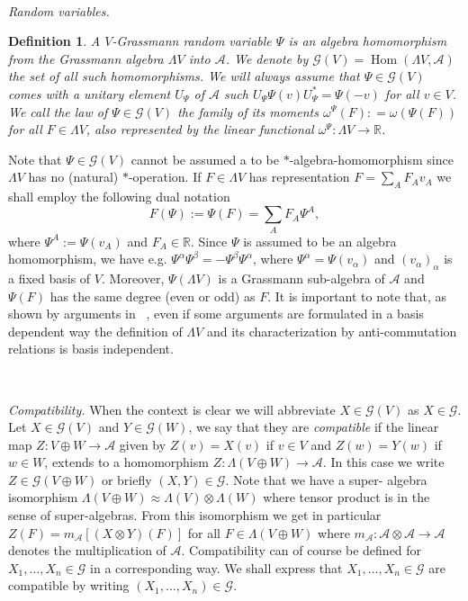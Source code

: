 \documentclass{article}
\newcommand{\assign}{:=}
\newcommand{\tmop}[1]{\ensuremath{\operatorname{#1}}}
\newcommand{\tmtextit}[1]{{\itshape{#1}}}
\newtheorem{definition}[theorem]{Definition}
\begin{document}
\

\tmtextit{Random variables.}

\begin{definition}
  A $V$-Grassmann random variable $\Psi$ is an algebra homomorphism from the
  Grassmann algebra $\Lambda V$ into $\mathcal{A}$. We denote by $\mathcal{G}
  (V) = \tmop{Hom} (\Lambda V, \mathcal{A})$ the set of all such
  homomorphisms. We will always assume that $\Psi \in \mathcal{G} (V)$ comes
  with a unitary element $U_{\Psi}$ of $\mathcal{A}$ such $U_{\Psi} \Psi (v)
  U_{\Psi}^{\ast} = \Psi (- v)$ for all $v \in V$. We call the \tmtextit{law}
  of $\Psi \in \mathcal{G} (V)$ the family of its moments $\omega^{\Psi} (F) :
  = \omega (\Psi (F))$ for all $F \in \Lambda V$, also represented by the
  linear functional $\omega^{\Psi} : \Lambda V \rightarrow \mathbb{R}$.
\end{definition}

Note that $\Psi \in \mathcal{G} (V)$ cannot be assumed a to be
$\ast$-algebra-homomorphism since $\Lambda V$ has no (natural)
$\ast$-operation. If $F \in \Lambda V$ has representation $F = \sum_A F_A v_A$
we shall employ the following dual notation
\[ F (\Psi) \assign \Psi (F) = \sum_A F_A \Psi^A, \]
where $\Psi^A \assign \Psi (v_A)$ and $F_A \in \mathbb{R}$. Since $\Psi$ is
assumed to be an algebra homomorphism, we have e.g. $\Psi^{\alpha}
\Psi^{\beta} = - \Psi^{\beta} \Psi^{\alpha}$, where $\Psi^{\alpha} = \Psi
(v_{\alpha})$ and $(v_{\alpha})_{\alpha}$ is a fixed basis of $V$. Moreover,
$\Psi (\Lambda V)$ is a Grassmann sub-algebra of $\mathcal{A}$ and $\Psi (F)$
has the same degree (even or odd) as $F$. It is important to note that, as
shown by arguments in \ {\cite{van2003algebra1,van2003algebra2}}, even if some
arguments are formulated in a basis dependent way the definition of $\Lambda
V$ and its characterization by anti-commutation relations is basis
independent.

\

\tmtextit{Compatibility.} When the context is clear we will abbreviate $X \in
\mathcal{G} (V)$ as $X \in \mathcal{G}$. Let $X \in \mathcal{G} (V)$ and $Y
\in \mathcal{G} (W)$, we say that they are \tmtextit{compatible} if the linear
map $Z : V \oplus W \rightarrow \mathcal{A}$ given by $Z (v) = X (v)$ if $v
\in V$ and $Z (w) = Y (w)$ if $w \in W$, extends to a homomorphism $Z :
\Lambda (V \oplus W) \rightarrow \mathcal{A}$. In this case we write $Z \in
\mathcal{G} (V \oplus W)$ or briefly $(X, Y) \in \mathcal{G}$. Note that we
have a super- algebra isomorphism $\Lambda (V \oplus W) \approx \Lambda (V)
\otimes \Lambda (W)$ where tensor product is in the sense of super-algebras.
From this isomorphism we get in particular $Z (F) = m_{\mathcal{A}} [(X
\otimes Y) (F)]$ for all $F \in \Lambda (V \oplus W)$ where $m_{\mathcal{A}} :
\mathcal{A} \otimes \mathcal{A} \rightarrow \mathcal{A}$ denotes the
multiplication of $\mathcal{A}$. Compatibility can of course be defined for
$X_1, \ldots, X_n \in \mathcal{G}$ in a corresponding way. We shall express
that $X_1, \ldots, X_n \in \mathcal{G}$ are compatible by writing $(X_1,
\ldots, X_n) \in \mathcal{G}$.
\end{document}
